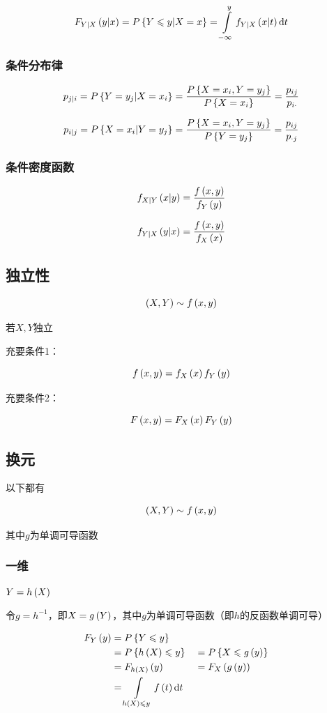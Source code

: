 \documentclass{article}
\begin{document}
\[F_{Y|X}\left(y|x\right)=P\left\{Y\leqslant y|X=x\right\}=\int\limits_{-\infty}^y f_{Y|X}\left(x|t\right)\mathrm d t\]

\subsubsection{条件分布律}

\[p_{j|i}=P\left\{Y=y_j|X=x_i\right\}=\frac{P\left\{X=x_i,Y=y_j\right\}}{P\left\{X=x_i\right\}}=\frac{p_{ij}}{p_{i\cdot}}\]

\[p_{i|j}=P\left\{X=x_i|Y=y_j\right\}=\frac{P\left\{X=x_i,Y=y_j\right\}}{P\left\{Y=y_j\right\}}=\frac{p_{ij}}{p_{\cdot j}}\]

\subsubsection{条件密度函数}

\[f_{X|Y}\left(x|y\right)=\frac{f\left(x,y\right)}{f_Y\left(y\right)}\]

\[f_{Y|X}\left(y|x\right)=\frac{f\left(x,y\right)}{f_X\left(x\right)}\]

\subsection{独立性}

\[\left(X,Y\right)\sim f\left(x,y\right)\]

若$X,Y$独立

充要条件1：

\[f\left(x,y\right)=f_X\left(x\right)f_Y\left(y\right)\]

充要条件2：

\[F\left(x,y\right)=F_X\left(x\right)F_Y\left(y\right)\]

\subsection{换元}

以下都有

\[\left(X,Y\right)\sim f\left(x,y\right)\]

其中$g$为单调可导函数

\subsubsection{一维}

$Y=h\left(X\right)$

令$g=h^{-1}$，即$X=g\left(Y\right)$，其中$g$为单调可导函数（即$h$的反函数单调可导）

\[\begin{aligned}
        F_Y\left(y\right) & =P\left\{Y\leqslant y\right\}                                                      \\
                 & =P\left\{h\left(X\right)\leqslant y\right\}                    &  & =P\left\{X\leqslant g\left(y\right)\right\} \\
                 & =F_{h\left(X\right)}\left(y\right)                           &  & =F_X\left(g\left(y\right)\right)          \\
                 & =\int\limits_{h\left(X\right)\leqslant y}f\left(t\right)\mathrm d t
    \end{aligned}\]
\end{document}
